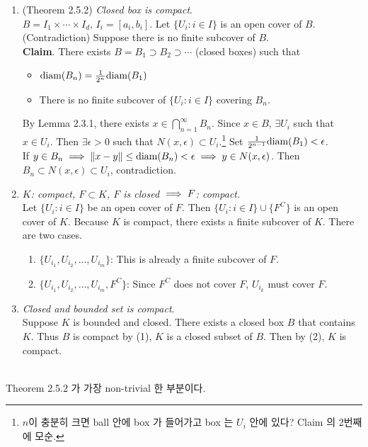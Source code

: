 \begin{enumerate}
	\item (Theorem 2.5.2) \textit{Closed box is compact}. \\
	$B = I_1\times\cdots\times I_d$, $I_i = [a_i, b_i]$. Let $\{U_i: i\in I \}$ is an open cover of $B$. \\
	(Contradiction) Suppose there is no finite subcover of $B$.\\
	\textbf{Claim}. There exists $B = B_1 \supset B_2\supset \cdots$ (closed boxes) such that
	\begin{itemize}
		\item $\text{diam} (B_n) = \frac{1}{2^n}\text{diam}(B_1)$
		\item There is no finite subcover of $\{U_i:i\in I \}$ covering $B_n$.
	\end{itemize}
	By Lemma 2.3.1, there exists $x\in \bigcap_{n=1}^\infty B_n$. Since $x\in B$, $\exists U_i$ such that $x\in U_i$. Then $\exists \epsilon>0$ such that $N(x, \epsilon) \subset U_i$.\footnote{$n$이 충분히 크면 ball 안에 box 가 들어가고 box 는 $U_i$ 안에 있다? Claim 의 2번째에 모순.} Set $\frac{1}{2^{n-1}}\text{diam} (B_1)<\epsilon$. \\
	If $y\in B_n \implies \left\lVert x-y\right\rVert \leq \text{diam}(B_n)<\epsilon\implies y\in N(x, \epsilon)$. Then $B_n \subset N(x , \epsilon)\subset U_i$, contradiction.
	
	\item \textit{$K$: compact, $F\subset K$, $F$ is closed $\implies F$: compact.}\\
	Let $\{U_i: i\in I\}$ be an open cover of $F$. Then $\{U_i: i\in I \} \cup \{F^C\}$ is an open cover of $K$. Because $K$ is compact, there exists a finite subcover of $K$. There are two cases.
	\begin{enumerate}
		\item $ \{U_{i_1}, U_{i_2}, \dots, U_{i_m} \} $:
		This is already a finite subcover of $F$.
		\item $ \{U_{i_1}, U_{i_2}, \dots, U_{i_m}, F^C \} $:
		Since $F^C$ does not cover $F$, $U_{i_k}$ must cover $F$.
	\end{enumerate}
	\item \textit{Closed and bounded set is compact}.\\
	Suppose $K$ is bounded and closed. There exists a closed box $B$ that contains $K$. Thus $B$ is compact by (1), $K$ is a closed subset of $B$. Then by (2), $K$ is compact.
\end{enumerate}~\\
Theorem 2.5.2 가 가장 non-trivial 한 부분이다.\\
